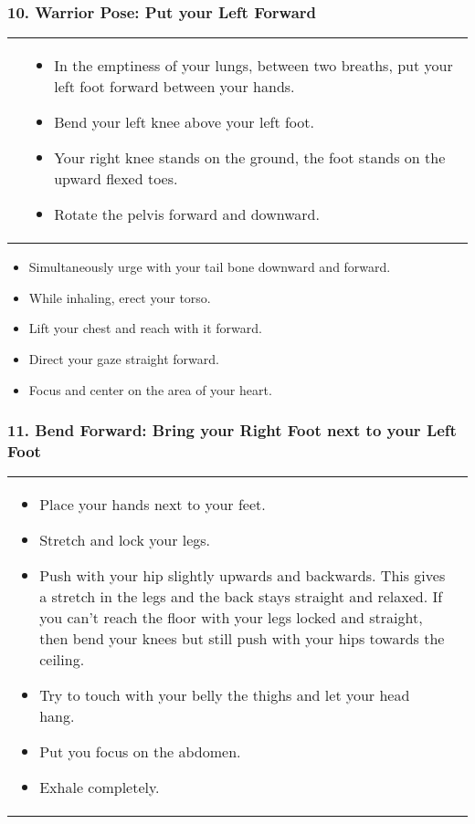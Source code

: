 \documentclass[../Book.Stress_regulation.tex]{subfiles}
\begin{document}
\subsubsection{10. Warrior Pose: Put your Left Forward}
\begin{tabular}{p{3.5cm} p{8cm} }
  \raisebox{-1.1\totalheight}{\texttt{[image: SS\_Warrior]}}
  &

\begin{itemize}
\item In the emptiness of your lungs, between two breaths, put your left foot forward between your hands.
  \item Bend your left knee above your left foot.
\item Your right knee stands on the ground, the foot stands on the upward flexed toes.
\item Rotate the pelvis forward and downward.
  \end{itemize}
\end{tabular}
\noindent \vspace{-5mm}
\begin{itemize}
\item Simultaneously urge with your tail bone downward and forward.
\item While inhaling, erect your torso.
\item Lift your chest and reach with it forward. 
\item Direct your gaze straight forward.
\item Focus and center on the area of your heart.    
\end{itemize}

\subsubsection{11. Bend Forward: Bring your Right Foot next to your Left Foot}
\begin{tabular}{p{10.5cm} p{1cm}}

\begin{itemize}
\item Place your hands next to your feet.
\item Stretch and lock your legs.
\item Push with your hip slightly upwards and backwards. This gives a stretch in the legs and the back stays straight and relaxed.
  If you can't reach the floor with your legs locked and straight, then bend your knees but still push with your hips towards the ceiling.
\item Try to touch with your belly the thighs and let your head hang.
\item Put you focus on the abdomen.
\item Exhale completely.
\end{itemize}
    &
    \raisebox{-1.2\totalheight}{\texttt{[image: SS\_ForwardBend]}}
  
\end{tabular}
\end{document}
